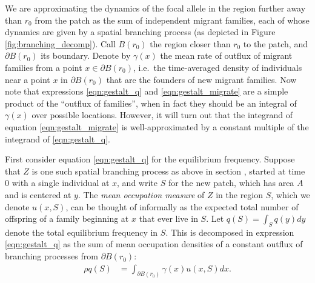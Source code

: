 \documentclass{article}
\newcommand{\linelabel}[1]{}
\newcommand{\E}{\mathbb{E}}
\newcommand{\secref}[1]{{\emph{\nameref{#1}}}}
\begin{document}
We are approximating the dynamics of the focal allele in the region further away than $r_0$ from the patch
as the sum of independent migrant families, each of whose dynamics are
given by a spatial branching process (as depicted in Figure \ref{fig:branching_decomp}).
Call $B(r_0)$ the region closer than $r_0$ to the patch, and $\partial B(r_0)$ its boundary.
Denote by $\gamma(x)$ the mean rate of outflux of migrant families from a point $x \in \partial B(r_0)$,
i.e.\ the time-averaged density of individuals near a point $x$ in $\partial B(r_0)$ 
that are the founders of new migrant families.
Now note that expressions \eqref{eqn:gestalt_q} and \eqref{eqn:gestalt_migrate} are a simple product of the ``outflux of families'',
when in fact they should be an integral of $\gamma(x)$ over possible locations. \linelabel{rr:awkward}
However,
it will turn out that the integrand of equation \eqref{eqn:gestalt_migrate} 
is well-approximated by a constant multiple of the integrand of \eqref{eqn:gestalt_q}.

First consider equation \eqref{eqn:gestalt_q} for the equilibrium frequency.
Suppose that $Z$ is one such spatial branching process as above in section \secref{ss:migrant_math}, 
started at time 0 with a single individual at $x$,
and write $S$ for the new patch, which has area $A$ and is centered at $y$.
The \emph{mean occupation measure} of $Z$ in the region $S$,
which we denote $u(x,S)$,
can be thought of informally \linelabel{rr:density}
as the expected total number of offspring of a family beginning at $x$ that ever live in $S$.
Let $q(S) = \int_S q(y) dy$ denote the total equilibrium frequency in $S$.
This is decomposed in expression \eqref{eqn:gestalt_q} 
as the sum of mean occupation densities of a constant outflux of branching processes
from $\partial B(r_0)$:
\begin{align} \label{eqn:occupation_integral}
    \rho q(S) &= \int_{\partial B(r_0)} \gamma(x) u(x,S) dx  . 
\end{align}
\end{document}
